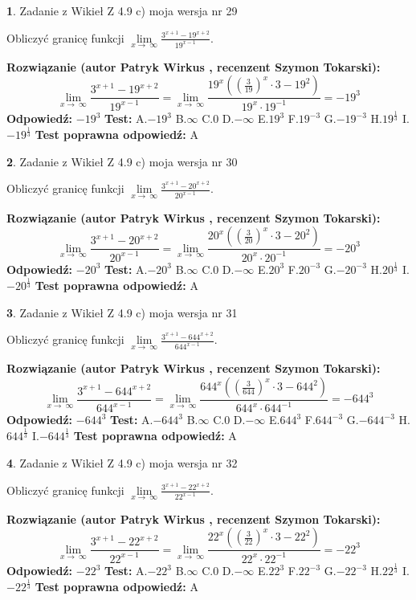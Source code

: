 \documentclass[12pt, a4paper]{article}
\theoremstyle{definition} %
\newtheorem{zad}{}
\newcommand{\zadStart}[1]{\begin{zad}#1\newline}
\newcommand{\zadStop}{\end{zad}}
\newcommand{\rozwStart}[2]{\noindent \textbf{Rozwiązanie (autor #1 , recenzent #2): }\newline}
\newcommand{\rozwStop}{\newline}
\newcommand{\odpStart}{\noindent \textbf{Odpowiedź:}\newline}
\newcommand{\odpStop}{\newline}
\newcommand{\testStart}{\noindent \textbf{Test:}\newline}
\newcommand{\testStop}{\newline}
\newcommand{\kluczStart}{\noindent \textbf{Test poprawna odpowiedź:}\newline}
\newcommand{\kluczStop}{\newline}
\begin{document}
\zadStart{Zadanie z Wikieł Z 4.9 c) moja wersja nr 29}


Obliczyć granicę funkcji  $\lim\limits_{x\to\ \infty}\frac{3^{x+1}-19^{x+2}}{19^{x-1}}$.
\zadStop
\rozwStart{Patryk Wirkus}{Szymon Tokarski}
$$\lim\limits_{x\to\ \infty}\frac{3^{x+1}-19^{x+2}}{19^{x-1}}=\lim\limits_{x\to\ \infty}\frac{19^{x}((\frac{3}{19})^{x}\cdot 3 -19^{2})}{19^{x}\cdot 19^{-1}} = -19^{3}$$
\rozwStop
\odpStart
$-19^{3}$
\odpStop
\testStart
A.$-19^{3}$ B.$\infty$ C.$0$ D.$-\infty$ E.$19^{3}$
F.$19^{-3}$ G.$-19^{-3}$
H.$19^{\frac{1}{3}}$
I.$-19^{\frac{1}{3}}$
\testStop
\kluczStart
A
\kluczStop



\zadStart{Zadanie z Wikieł Z 4.9 c) moja wersja nr 30}


Obliczyć granicę funkcji  $\lim\limits_{x\to\ \infty}\frac{3^{x+1}-20^{x+2}}{20^{x-1}}$.
\zadStop
\rozwStart{Patryk Wirkus}{Szymon Tokarski}
$$\lim\limits_{x\to\ \infty}\frac{3^{x+1}-20^{x+2}}{20^{x-1}}=\lim\limits_{x\to\ \infty}\frac{20^{x}((\frac{3}{20})^{x}\cdot 3 -20^{2})}{20^{x}\cdot 20^{-1}} = -20^{3}$$
\rozwStop
\odpStart
$-20^{3}$
\odpStop
\testStart
A.$-20^{3}$ B.$\infty$ C.$0$ D.$-\infty$ E.$20^{3}$
F.$20^{-3}$ G.$-20^{-3}$
H.$20^{\frac{1}{3}}$
I.$-20^{\frac{1}{3}}$
\testStop
\kluczStart
A
\kluczStop



\zadStart{Zadanie z Wikieł Z 4.9 c) moja wersja nr 31}


Obliczyć granicę funkcji  $\lim\limits_{x\to\ \infty}\frac{3^{x+1}-644^{x+2}}{644^{x-1}}$.
\zadStop
\rozwStart{Patryk Wirkus}{Szymon Tokarski}
$$\lim\limits_{x\to\ \infty}\frac{3^{x+1}-644^{x+2}}{644^{x-1}}=\lim\limits_{x\to\ \infty}\frac{644^{x}((\frac{3}{644})^{x}\cdot 3 -644^{2})}{644^{x}\cdot 644^{-1}} = -644^{3}$$
\rozwStop
\odpStart
$-644^{3}$
\odpStop
\testStart
A.$-644^{3}$ B.$\infty$ C.$0$ D.$-\infty$ E.$644^{3}$
F.$644^{-3}$ G.$-644^{-3}$
H.$644^{\frac{1}{3}}$
I.$-644^{\frac{1}{3}}$
\testStop
\kluczStart
A
\kluczStop



\zadStart{Zadanie z Wikieł Z 4.9 c) moja wersja nr 32}


Obliczyć granicę funkcji  $\lim\limits_{x\to\ \infty}\frac{3^{x+1}-22^{x+2}}{22^{x-1}}$.
\zadStop
\rozwStart{Patryk Wirkus}{Szymon Tokarski}
$$\lim\limits_{x\to\ \infty}\frac{3^{x+1}-22^{x+2}}{22^{x-1}}=\lim\limits_{x\to\ \infty}\frac{22^{x}((\frac{3}{22})^{x}\cdot 3 -22^{2})}{22^{x}\cdot 22^{-1}} = -22^{3}$$
\rozwStop
\odpStart
$-22^{3}$
\odpStop
\testStart
A.$-22^{3}$ B.$\infty$ C.$0$ D.$-\infty$ E.$22^{3}$
F.$22^{-3}$ G.$-22^{-3}$
H.$22^{\frac{1}{3}}$
I.$-22^{\frac{1}{3}}$
\testStop
\kluczStart
A
\kluczStop
\end{document}
